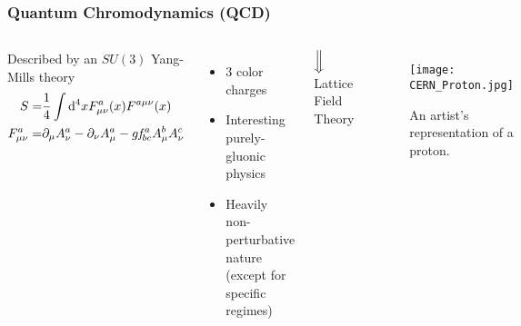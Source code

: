 \documentclass{beamer}
\begin{document}
\begin{frame}
  \frametitle{Quantum Chromodynamics (QCD)}
  \centering
{}
  \begin{columns}[c]
      \centering
      Described by an $\mathit{SU}(3)$ Yang-Mills theory
      \begin{align*}
        S =& \frac14\int\dd^4x F^a_{\mu\nu}(x)F^{a\mu\nu}(x)\\
        F^a_{\mu\nu} =& \partial_\mu A^a_\nu - \partial_\nu A^a_\mu -g \mathit{f}^a_{bc} A^b_\mu A^c_\nu
      \end{align*}
      \begin{itemize} 
        \item<2-> $3$ color charges
        \item<3-> Interesting purely-gluonic physics
        \item<4-> Heavily non-perturbative nature (except for specific regimes)
      \end{itemize}
      $\Big\Downarrow$\\
      \vspace{0.5\baselineskip}
      Lattice Field Theory
      \centering
{}
      \begin{figure}[t]
        \texttt{[image: CERN\_Proton.jpg]}
        \caption{An artist's representation of a proton\cite{protonImg}.}
        \vspace{0.5\baselineskip}
      \end{figure}
  \end{columns}
\end{frame}
\end{document}
